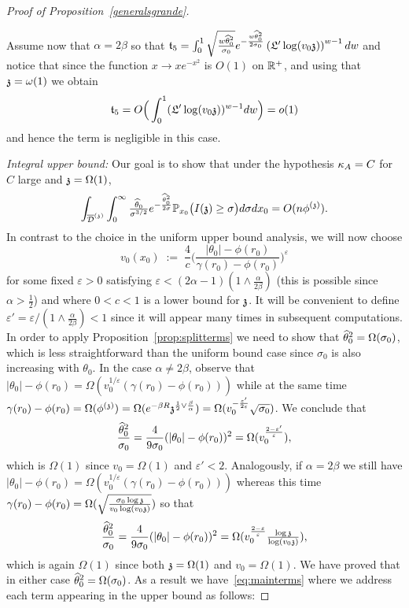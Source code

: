 \begin{proof}[Proof of Proposition~\ref{generalsgrande}]
\begin{itemize}
Assume now that $\alpha=2\beta$ so that $\mathfrak{t}_5=\int_{0}^{1}\sqrt{\tfrac{w\hatt^2}{\sigma_0}}e^{-\frac{w\hatt^2}{2\sigma_0}}\left(\auxl'\log(v_0\ss)\right)^{w-1}dw$ and notice that since the function $x\to xe^{-x^2}$ is $O(1)$ on $\RR^+$, and using that $\ss=\omega(1)$ we obtain
\[\mathfrak{t}_5=O\Big(\int_{0}^{1}(\auxl'\log(v_0\ss))^{w-1}dw\Big)=o(1)\]
and hence the term is negligible in this case.
\end{itemize}

\medskip

\noindent\textit{Integral upper bound:} Our goal is to show that under the hypothesis $\KA= C$ for $C$ large and $\ss=\Omega(1)$,
\[\int_{\ndt}\int_0^\infty\tfrac{\hatt}{\sigma^{3/2}}e^{-\frac{\hatt^2}{2\sigma}}\PP_{x_0}\big(\II{\ss}\geq\sigma\big)d\sigma dx_0 = O(n\phis).\]
In contrast to the choice in the uniform upper bound analysis, we will now choose 
\[v_0(x_0)\;:=\;\frac{4}{c}\Big(\frac{|\theta_0|-\phi(r_0)}{\gamma(r_0)-\phi(r_0)}\Big)^{\varepsilon}\]
for some fixed $\varepsilon>0$ satisfying $\varepsilon<(2\alpha-1)(1\wedge\frac{\alpha}{2\beta})$ (this is possible since $\alpha>\frac{1}{2}$) and where $0<c<1$ is a lower bound for $\ss$. It will be convenient to define $\varepsilon'=\varepsilon/(1\wedge\frac{\alpha}{2\beta})< 1$ since it will appear many times in subsequent computations. %
In order to apply Proposition~\ref{prop:splitterms} we need to show that $\hatt^2=\Omega(\sigma_0)$, which is less straightforward than the uniform bound case since $\sigma_0$ is also increasing with $\theta_0$. In the case $\alpha\neq2\beta$, observe that $|\theta_0|-\phi(r_0)=\Omega(v_0^{1/\varepsilon}(\gamma(r_0)-\phi(r_0)))$ while at the same time $\gamma(r_0)-\phi(r_0)=\Omega(\phis)=\Omega(e^{-\beta R}\ss^{\frac{1}{2}\vee\frac{\beta}{\alpha}})=\Omega(v_0^{-\frac{\varepsilon'}{2\varepsilon}}\sqrt{\sigma_0})$. We conclude that
\begin{equation}\label{eq:mixfracneq}
\frac{\hatt^2}{\sigma_0} = \frac{4}{9\sigma_0}(|\theta_0|-\phi(r_0))^2=\Omega(v_0^{\frac{2-\varepsilon'}{\varepsilon}}),
\end{equation}
which is $\Omega(1)$ since $v_0=\Omega(1)$ and $\varepsilon'<2$. Analogously, if $\alpha=2\beta$ we still have $|\theta_0|-\phi(r_0)=\Omega(v_0^{1/\varepsilon}(\gamma(r_0)-\phi(r_0)))$ whereas this time $\gamma(r_0)-\phi(r_0)=\Omega(\sqrt{\frac{\sigma_0\log\ss}{v_0\log(v_0\ss)}})$ so that 
\begin{equation}\label{eq:mixfraceq}\frac{\hatt^2}{\sigma_0}= \frac{4}{9\sigma_0}(|\theta_0|-\phi(r_0))^2=\Omega(v_0^{\frac{2-\varepsilon}{\varepsilon}}\tfrac{\log\ss}{\log(v_0\ss)}),\end{equation}
which is again $\Omega(1)$ since both $\ss=\Omega(1)$ and $v_0=\Omega(1)$. We have proved that in either case $\hatt^2=\Omega(\sigma_0)$. As a result we have~\eqref{eq:mainterms} where we address each term appearing in the upper bound as follows:


\end{proof}
